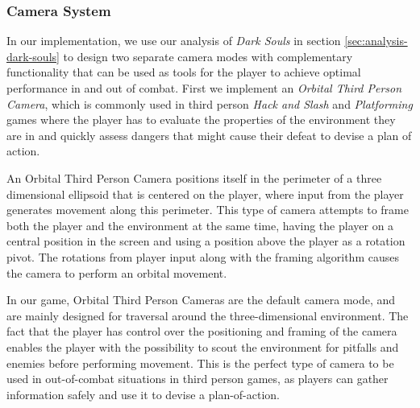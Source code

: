 \subsubsection{Camera System}
\label{sec:lock-on-camera}

In our implementation, we use our analysis of \emph{Dark Souls} in section \ref{sec:analysis-dark-souls} to design two separate camera modes with complementary functionality that can be used as tools for the player to achieve optimal performance in and out of combat. First we implement an \emph{Orbital Third Person Camera}, which is commonly used in third person \emph{Hack and Slash} and \emph{Platforming} games where the player has to evaluate the properties of the environment they are in and quickly assess dangers that might cause their defeat to devise a plan of action.

An Orbital Third Person Camera positions itself in the perimeter of a three dimensional ellipsoid that is centered on the player, where input from the player generates movement along this perimeter. This type of camera attempts to frame both the player and the environment at the same time, having the player on a central position in the screen and using a position above the player as a rotation pivot. The rotations from player input along with the framing algorithm causes the camera to perform an orbital movement.

In our game, Orbital Third Person Cameras are the default camera mode, and are mainly designed for traversal around the three-dimensional environment. The fact that the player has control over the positioning and framing of the camera enables the player with the possibility to scout the environment for pitfalls and enemies before performing movement. This is the perfect type of camera to be used in out-of-combat situations in third person games, as players can gather information safely and use it to devise a plan-of-action.

